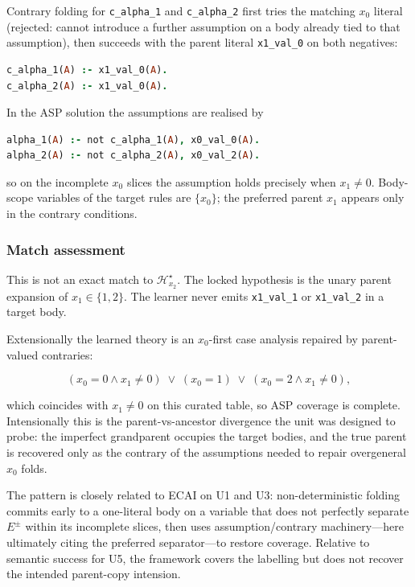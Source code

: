 \documentclass[11pt]{article}
\begin{document}
Contrary folding for \texttt{c\_alpha\_1} and \texttt{c\_alpha\_2} first tries the matching \(x_0\) literal (rejected: cannot introduce a further assumption on a body already tied to that assumption), then succeeds with the parent literal \texttt{x1\_val\_0} on both negatives:

\begin{lstlisting}[style=logic,language=Prolog]
c_alpha_1(A) :- x1_val_0(A).
c_alpha_2(A) :- x1_val_0(A).
\end{lstlisting}

In the ASP solution the assumptions are realised by

\begin{lstlisting}[style=logic,language=Prolog]
alpha_1(A) :- not c_alpha_1(A), x0_val_0(A).
alpha_2(A) :- not c_alpha_2(A), x0_val_2(A).
\end{lstlisting}

so on the incomplete \(x_0\) slices the assumption holds precisely when \(x_1\neq 0\). Body-scope variables of the target rules are \(\{x_0\}\); the preferred parent \(x_1\) appears only in the contrary conditions.

\subsubsection{Match assessment}

This is not an exact match to \(\mathcal{H}_{x_2}^\star\). The locked hypothesis is the unary parent expansion of \(x_1\in\{1,2\}\). The learner never emits \texttt{x1\_val\_1} or \texttt{x1\_val\_2} in a target body.

Extensionally the learned theory is an \(x_0\)-first case analysis repaired by parent-valued contraries:

\[ (x_0=0 \land x_1\neq 0)\;\lor\;(x_0=1)\;\lor\;(x_0=2 \land x_1\neq 0), \]

which coincides with \(x_1\neq 0\) on this curated table, so ASP coverage is complete. Intensionally this is the parent-vs-ancestor divergence the unit was designed to probe: the imperfect grandparent occupies the target bodies, and the true parent is recovered only as the contrary of the assumptions needed to repair overgeneral \(x_0\) folds.

The pattern is closely related to ECAI on U1 and U3: non-deterministic folding commits early to a one-literal body on a variable that does not perfectly separate \(E^\pm\) within its incomplete slices, then uses assumption/contrary machinery---here ultimately citing the preferred separator---to restore coverage. Relative to semantic success for U5, the framework covers the labelling but does not recover the intended parent-copy intension.
\end{document}
